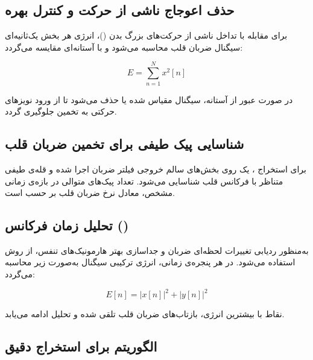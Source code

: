 \subsection{حذف اعوجاج ناشی از حرکت و کنترل بهره}
\label{sec:motion-artifacts}

برای مقابله با تداخل ناشی از حرکت‌های بزرگ بدن ()، انرژی هر بخش یک‌ثانیه‌ای سیگنال ضربان قلب محاسبه می‌شود و با آستانه‌ای مقایسه می‌گردد:

\begin{equation}
E = \sum_{n=1}^{N} x^2[n]
\label{eq:energy}
\end{equation}

در صورت عبور از آستانه، سیگنال مقیاس شده یا حذف می‌شود تا از ورود نویزهای حرکتی به تخمین جلوگیری گردد.

\subsection{ شناسایی پیک طیفی برای تخمین ضربان قلب}
\label{sec:peak-counting}

برای استخراج ، یک  روی بخش‌های سالم خروجی فیلتر ضربان اجرا شده و قله‌ی طیفی متناظر با فرکانس قلب شناسایی می‌شود. تعداد پیک‌های متوالی در بازه‌ی زمانی مشخص، معادل نرخ ضربان قلب بر حسب  است.

\subsection{تحلیل زمان فرکانس ()}
\label{sec:stft}

به‌منظور ردیابی تغییرات لحظه‌ای ضربان و جداسازی بهتر هارمونیک‌های تنفس، از روش  استفاده می‌شود. در هر پنجره‌ی زمانی، انرژی ترکیبی سیگنال به‌صورت زیر محاسبه می‌گردد:

\begin{equation}
E[n] = |x[n]|^2 + |y[n]|^2
\label{eq:stft_energy}
\end{equation}

نقاط با بیشترین انرژی، بازتاب‌های ضربان قلب تلقی شده و تحلیل ادامه می‌یابد.

\subsection{الگوریتم  برای استخراج دقیق }
\label{sec:health-vmd}

